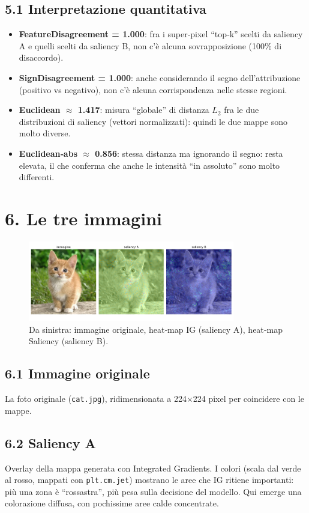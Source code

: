 \documentclass[a4paper,11pt]{article}
\begin{document}
\subsection*{5.1 Interpretazione quantitativa}
\begin{itemize}
\item \textbf{FeatureDisagreement = 1.000}: fra i super‐pixel “top‐k” scelti da saliency A e quelli scelti da saliency B, non c’è alcuna sovrapposizione (100\% di disaccordo).
\item \textbf{SignDisagreement = 1.000}: anche considerando il segno dell’attribuzione (positivo vs negativo), non c’è alcuna corrispondenza nelle stesse regioni.
\item \textbf{Euclidean $\approx$ 1.417}: misura “globale” di distanza $L_2$ fra le due distribuzioni di saliency (vettori normalizzati): quindi le due mappe sono molto diverse.
\item \textbf{Euclidean‐abs $\approx$ 0.856}: stessa distanza ma ignorando il segno: resta elevata, il che conferma che anche le intensità “in assoluto” sono molto differenti.
\end{itemize}

\section*{6. Le tre immagini}
\begin{figure}[htbp]
\centering
\includegraphics[height=3.5cm]{saliency.png}\qquad
\caption{Da sinistra: immagine originale, heat‐map IG (saliency A), heat‐map Saliency (saliency B).}
\label{fig:three_images}
\end{figure}

\subsection*{6.1 Immagine originale}
La foto originale (\texttt{cat.jpg}), ridimensionata a 224×224 pixel per coincidere con le mappe.

\subsection*{6.2 Saliency A}
Overlay della mappa generata con Integrated Gradients. I colori (scala dal verde al rosso, mappati con \texttt{plt.cm.jet}) mostrano le aree che IG ritiene importanti: più una zona è “rossastra”, più pesa sulla decisione del modello. Qui emerge una colorazione diffusa, con pochissime aree calde concentrate.
\end{document}
